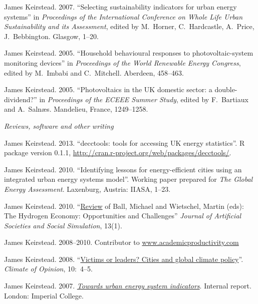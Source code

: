 \documentclass[11pt,a4paper]{article}
\begin{document}
\ind James Keirstead. 2007. ``Selecting sustainability indicators for urban energy systems'' in \emph{Proceedings of the International Conference on Whole Life Urban Sustainability and its Assessment}, edited by M.\ Horner, C.\ 
Hardcastle, A.\ Price, J.\ Bebbington. Glasgow, 1--20.

\ind James Keirstead. 2005. ``Household behavioural responses to photovoltaic-system monitoring devices'' in \emph{Proceedings of the World Renewable Energy Congress}, edited by M.\ Imbabi and C.\ Mitchell. Aberdeen, 458--463.

\ind James Keirstead. 2005. ``Photovoltaics in the UK domestic sector: a double-dividend?'' in \emph{Proceedings of the ECEEE Summer Study}, edited by F.\ Bartiaux and A.\ Saln{\ae}s. Mandelieu, France, 1249--1258.

\bigskip
 
\noindent\emph{Reviews, software and other writing \vspace{0.05in}}


\ind James Keirstead. 2013. ``decctools: tools for accessing UK energy statistics''. R package version 0.1.1, \url{http://cran.r-project.org/web/packages/decctools/}.

\ind James Keirstead. 2010. ``Identifying lessons for energy-efficient cities using an integrated urban energy systems model''.  Working paper prepared for \emph{The Global Energy Assessment}.  Laxenburg, Austria: IIASA, 1--23.

\ind James Keirstead. 2010. ``\href{http://jasss.soc.surrey.ac.uk/13/1/reviews/keirstead.html}{Review} of Ball, Michael and Wietschel, Martin (eds): The Hydrogen Economy: Opportunities and Challenges'' \emph{Journal of Artificial Societies and Social Simulation}, 13(1).

\ind James Keirstead. 2008--2010.  Contributor to \href{http://www.academicproductivity.com}{www.academicproductivity.com}

\ind James Keirstead. 2008. ``\href{http://www.stockholm-network.org/downloads/publications/Climate_of_Opinion_10.pdf}{Victims or leaders? Cities and global climate policy}''. \emph{Climate of Opinion}, 10:~4--5.

\ind James Keirstead. 2007.  \href{http://www3.imperial.ac.uk/pls/portallive/docs/1/24897696.PDF}{\emph{Towards urban energy system indicators}}.  Internal report. London: Imperial College.
\end{document}
